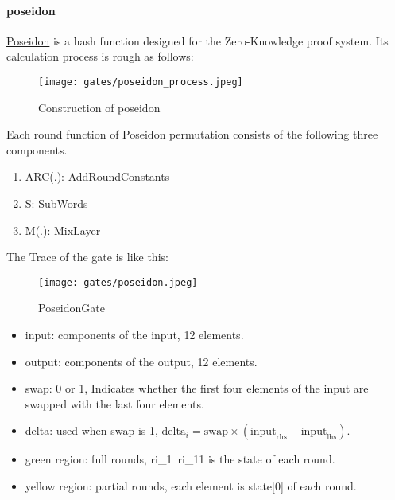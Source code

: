 \paragraph{poseidon}

\href{https://www.poseidon-hash.info/}{Poseidon} is a hash function designed for the Zero-Knowledge proof system.
Its calculation process is rough as follows:

\begin{figure}[!ht]
    \centering
    \texttt{[image: gates/poseidon\_process.jpeg]}
    \caption{Construction of poseidon}
    \label{fig:poseidon-process}
\end{figure}

Each round function of Poseidon permutation consists of the following three components.
\begin{enumerate}
    \item ARC(.): AddRoundConstants
    \item S: SubWords
    \item M(.): MixLayer
\end{enumerate}

The Trace of the gate is like this:
\begin{figure}[!ht]
    \centering
    \texttt{[image: gates/poseidon.jpeg]}
    \caption{PoseidonGate}
    \label{fig:poseidon-gate}
\end{figure}

\begin{itemize}
    \item input: components of the input, 12 elements.
    \item output: components of the output, 12 elements.
    \item swap: 0 or 1, Indicates whether the first four elements of the input are swapped with the last four elements.
    \item delta: used when swap is 1, $\text{delta}_i = \text{swap} \times (\text{input}_{\text{rhs}} - \text{input}_{\text{lhs}})$.
    \item green region: full rounds, ri\_1~ri\_11 is the state of each round.
    \item yellow region: partial rounds, each element is state[0] of each round.
\end{itemize}

